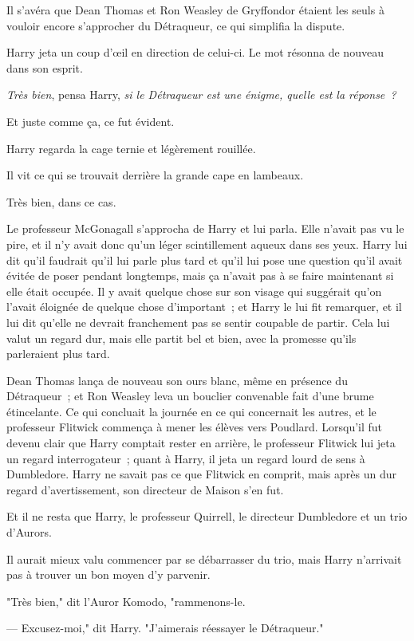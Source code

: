 Il s'avéra que Dean Thomas et Ron Weasley de Gryffondor étaient les seuls à vouloir encore s'approcher du Détraqueur, ce qui simplifia la dispute.

Harry jeta un coup d'œil en direction de celui-ci. Le mot résonna de nouveau dans son esprit.

\emph{Très bien}, pensa Harry, \emph{si le Détraqueur est une énigme, quelle est la réponse~?}

Et juste comme ça, ce fut évident.

Harry regarda la cage ternie et légèrement rouillée.

Il vit ce qui se trouvait derrière la grande cape en lambeaux.

Très bien, dans ce cas.

Le professeur McGonagall s'approcha de Harry et lui parla. Elle n'avait pas vu le pire, et il n'y avait donc qu'un léger scintillement aqueux dans ses yeux. Harry lui dit qu'il faudrait qu'il lui parle plus tard et qu'il lui pose une question qu'il avait évitée de poser pendant longtemps, mais ça n'avait pas à se faire maintenant si elle était occupée. Il y avait quelque chose sur son visage qui suggérait qu'on l'avait éloignée de quelque chose d'important~; et Harry le lui fit remarquer, et il lui dit qu'elle ne devrait franchement pas se sentir coupable de partir. Cela lui valut un regard dur, mais elle partit bel et bien, avec la promesse qu'ils parleraient plus tard.

Dean Thomas lança de nouveau son ours blanc, même en présence du Détraqueur~; et Ron Weasley leva un bouclier convenable fait d'une brume étincelante. Ce qui concluait la journée en ce qui concernait les autres, et le professeur Flitwick commença à mener les élèves vers Poudlard. Lorsqu'il fut devenu clair que Harry comptait rester en arrière, le professeur Flitwick lui jeta un regard interrogateur~; quant à Harry, il jeta un regard lourd de sens à Dumbledore. Harry ne savait pas ce que Flitwick en comprit, mais après un dur regard d'avertissement, son directeur de Maison s'en fut.

Et il ne resta que Harry, le professeur Quirrell, le directeur Dumbledore et un trio d'Aurors.

Il aurait mieux valu commencer par se débarrasser du trio, mais Harry n'arrivait pas à trouver un bon moyen d'y parvenir.

"Très bien," dit l'Auror Komodo, "rammenons-le.

--- Excusez-moi," dit Harry. "J'aimerais réessayer le Détraqueur."

